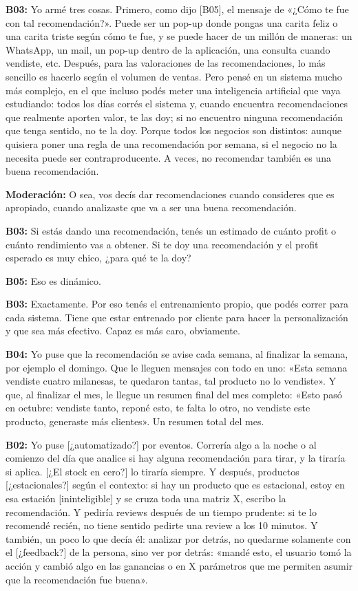 \noindent\textbf{B03:} Yo armé tres cosas. Primero, como dijo [B05], el mensaje de «¿Cómo te fue con tal recomendación?». Puede ser un pop-up donde pongas una carita feliz o una carita triste según cómo te fue, y se puede hacer de un millón de maneras: un WhatsApp, un mail, un pop-up dentro de la aplicación, una consulta cuando vendiste, etc. Después, para las valoraciones de las recomendaciones, lo más sencillo es hacerlo según el volumen de ventas. Pero pensé en un sistema mucho más complejo, en el que incluso podés meter una inteligencia artificial que vaya estudiando: todos los días corrés el sistema y, cuando encuentra recomendaciones que realmente aporten valor, te las doy; si no encuentro ninguna recomendación que tenga sentido, no te la doy. Porque todos los negocios son distintos: aunque quisiera poner una regla de una recomendación por semana, si el negocio no la necesita puede ser contraproducente. A veces, no recomendar también es una buena recomendación.

\noindent\textbf{Moderación:} O sea, vos decís dar recomendaciones cuando consideres que es apropiado, cuando analizaste que va a ser una buena recomendación.

\noindent\textbf{B03:} Si estás dando una recomendación, tenés un estimado de cuánto profit o cuánto rendimiento vas a obtener. Si te doy una recomendación y el profit esperado es muy chico, ¿para qué te la doy?

\noindent\textbf{B05:} Eso es dinámico.

\noindent\textbf{B03:} Exactamente. Por eso tenés el entrenamiento propio, que podés correr para cada sistema. Tiene que estar entrenado por cliente para hacer la personalización y que sea más efectivo. Capaz es más caro, obviamente.

\noindent\textbf{B04:} Yo puse que la recomendación se avise cada semana, al finalizar la semana, por ejemplo el domingo. Que le lleguen mensajes con todo en uno: «Esta semana vendiste cuatro milanesas, te quedaron tantas, tal producto no lo vendiste». Y que, al finalizar el mes, le llegue un resumen final del mes completo: «Esto pasó en octubre: vendiste tanto, reponé esto, te falta lo otro, no vendiste este producto, generaste más clientes». Un resumen total del mes.

\noindent\textbf{B02:} Yo puse [¿automatizado?] por eventos. Correría algo a la noche o al comienzo del día que analice si hay alguna recomendación para tirar, y la tiraría si aplica. [¿El stock en cero?] lo tiraría siempre. Y después, productos [¿estacionales?] según el contexto: si hay un producto que es estacional, estoy en esa estación [ininteligible] y se cruza toda una matriz X, escribo la recomendación. Y pediría reviews después de un tiempo prudente: si te lo recomendé recién, no tiene sentido pedirte una review a los 10 minutos. Y también, un poco lo que decía él: analizar por detrás, no quedarme solamente con el [¿feedback?] de la persona, sino ver por detrás: «mandé esto, el usuario tomó la acción y cambió algo en las ganancias o en X parámetros que me permiten asumir que la recomendación fue buena».

